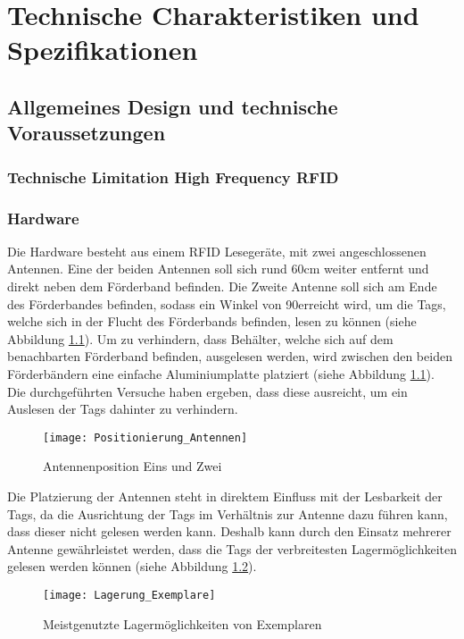\chapter{Technische Charakteristiken und Spezifikationen}

\section{Allgemeines Design und technische Voraussetzungen}

\subsection{Technische Limitation High Frequency RFID}

\subsection{Hardware}
Die Hardware besteht aus einem RFID Lesegeräte, mit zwei angeschlossenen Antennen. Eine der beiden Antennen soll sich rund 60cm weiter entfernt und direkt neben dem Förderband befinden. Die Zweite Antenne soll sich am Ende des Förderbandes befinden, sodass ein Winkel von 90\SIUnitSymbolDegree erreicht wird, um die Tags, welche sich in der Flucht des Förderbands befinden, lesen zu können (siehe Abbildung \ref{fig:positionAntennen}). Um zu verhindern, dass Behälter, welche sich auf dem benachbarten Förderband befinden, ausgelesen werden, wird zwischen den beiden Förderbändern eine einfache Aluminiumplatte platziert (siehe Abbildung \ref{fig:positionAntennen}). Die durchgeführten Versuche haben ergeben, dass diese ausreicht, um ein Auslesen der Tags dahinter zu verhindern.

\begin{figure}[htb]
	\centering
	\texttt{[image: Positionierung\_Antennen]}
	\caption{Antennenposition Eins und Zwei}
	\label{fig:positionAntennen}
\end{figure}

Die Platzierung der Antennen steht in direktem Einfluss mit der Lesbarkeit der Tags, da die Ausrichtung der Tags im Verhältnis zur Antenne dazu führen kann, dass dieser nicht gelesen werden kann. Deshalb kann durch den Einsatz mehrerer Antenne gewährleistet werden, dass die Tags der verbreitesten Lagermöglichkeiten gelesen werden können (siehe Abbildung \ref{fig:lagermöglichkeitExemplare}).

\begin{figure}[htb]
	\centering
	\texttt{[image: Lagerung\_Exemplare]}
	\caption{Meistgenutzte Lagermöglichkeiten von Exemplaren}
	\label{fig:lagermöglichkeitExemplare}
\end{figure}

